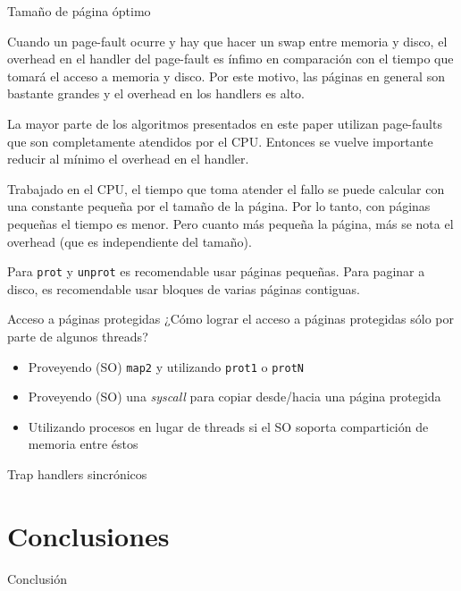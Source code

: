 \documentclass[xcolor=pdftex,dvipsnames,usenames,table]{beamer}
\begin{document}
\begin{frame}{Tamaño de página óptimo}

\pause Cuando un page-fault ocurre y hay que hacer un swap entre memoria y disco, el overhead en el handler del page-fault es ínfimo en comparación con el tiempo que tomará el acceso a memoria y disco. Por este motivo, las páginas en general son bastante grandes y el overhead en los handlers es alto.

\pause La mayor parte de los algoritmos presentados en este paper utilizan page-faults que son completamente atendidos por el CPU. Entonces se vuelve importante reducir al mínimo el overhead en el handler.

\pause Trabajado en el CPU, el tiempo que toma atender el fallo se puede calcular con una constante pequeña por el tamaño de la página. Por lo tanto, con páginas pequeñas el tiempo es menor. Pero cuanto más pequeña la página, más se nota el overhead (que es independiente del tamaño).

\pause Para \texttt{prot} y \texttt{unprot} es recomendable usar páginas pequeñas. Para paginar a disco, es recomendable usar bloques de varias páginas contiguas.

\end{frame}

\begin{frame}{Acceso a páginas protegidas}
\pause ¿Cómo lograr el acceso a páginas protegidas sólo por parte de algunos threads?

\pause
\begin{itemize}
	\item Proveyendo (SO) \texttt{map2} y utilizando \texttt{prot1} o \texttt{protN}
	\item Proveyendo (SO) una \emph{syscall} para copiar desde/hacia una página protegida
	\item Utilizando procesos en lugar de threads si el SO soporta compartición de memoria entre éstos

\end{itemize}

\end{frame}

\begin{frame}{Trap handlers sincrónicos}
\end{frame}

\section{Conclusiones}

\begin{frame}{Conclusión}
\end{frame}
\end{document}
